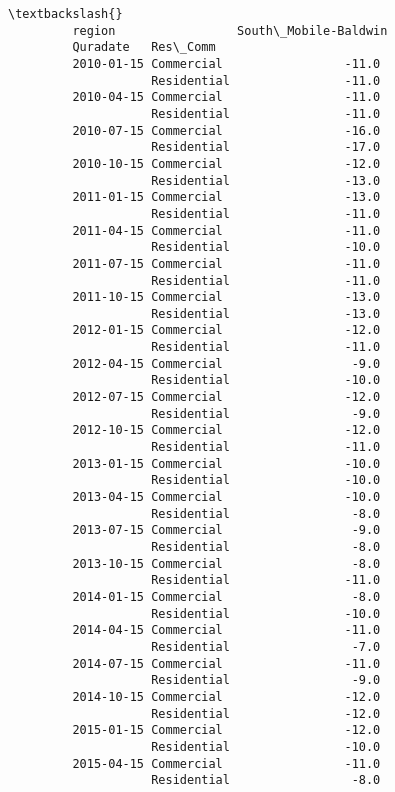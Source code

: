 \documentclass[11pt]{article}
\begin{document}
\begin{Verbatim}[commandchars=\\\{\}]
                                                      \textbackslash{}
         region                 South\_Mobile-Baldwin   
         Quradate   Res\_Comm                           
         2010-01-15 Commercial                 -11.0   
                    Residential                -11.0   
         2010-04-15 Commercial                 -11.0   
                    Residential                -11.0   
         2010-07-15 Commercial                 -16.0   
                    Residential                -17.0   
         2010-10-15 Commercial                 -12.0   
                    Residential                -13.0   
         2011-01-15 Commercial                 -13.0   
                    Residential                -11.0   
         2011-04-15 Commercial                 -11.0   
                    Residential                -10.0   
         2011-07-15 Commercial                 -11.0   
                    Residential                -11.0   
         2011-10-15 Commercial                 -13.0   
                    Residential                -13.0   
         2012-01-15 Commercial                 -12.0   
                    Residential                -11.0   
         2012-04-15 Commercial                  -9.0   
                    Residential                -10.0   
         2012-07-15 Commercial                 -12.0   
                    Residential                 -9.0   
         2012-10-15 Commercial                 -12.0   
                    Residential                -11.0   
         2013-01-15 Commercial                 -10.0   
                    Residential                -10.0   
         2013-04-15 Commercial                 -10.0   
                    Residential                 -8.0   
         2013-07-15 Commercial                  -9.0   
                    Residential                 -8.0   
         2013-10-15 Commercial                  -8.0   
                    Residential                -11.0   
         2014-01-15 Commercial                  -8.0   
                    Residential                -10.0   
         2014-04-15 Commercial                 -11.0   
                    Residential                 -7.0   
         2014-07-15 Commercial                 -11.0   
                    Residential                 -9.0   
         2014-10-15 Commercial                 -12.0   
                    Residential                -12.0   
         2015-01-15 Commercial                 -12.0   
                    Residential                -10.0   
         2015-04-15 Commercial                 -11.0   
                    Residential                 -8.0   

\end{Verbatim}
\end{document}
